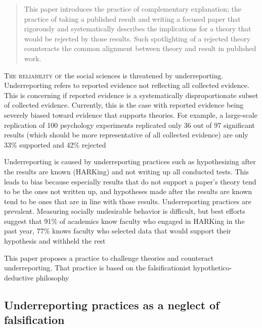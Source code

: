 \documentclass[empirical, authordate, meta]{jote-new-article}
\author[1]{Joeri van Hugten{\orcid{https://orcid.org/0000-0002-8040-5192}}}
\affil[1]{Vrije Universiteit Amsterdam}
\begin{document}
\begin{frontmatter}
\maketitle
\begin{abstract}
This paper introduces the practice of complementary explanation; the practice of taking a published result and writing a focused paper that rigorously and systematically describes the implications for a theory that would be rejected by those results. Such spotlighting of a rejected theory counteracts the common alignment between theory and result in published work.
\end{abstract}
\end{frontmatter}


\lettrine{T}{he reliability of} the social sciences is threatened by underreporting. Underreporting refers to reported evidence not reflecting all collected evidence. This is concerning if reported evidence is a systematically disproportionate subset of collected evidence. Currently, this is the case with reported evidence being severely biased toward evidence that supports theories. For example, a large-scale replication of 100 psychology experiments replicated only 36 out of 97 significant results \parencite{Collaboration2015}(which should be more representative of all collected evidence) are only 33\% supported and 42\% rejected \parencite{Mazzola2013, Hugten2021}

Underreporting is caused by underreporting practices such as hypothesizing after the results are known (HARKing) and not writing up all conducted tests. This leads to bias because especially results that do not support a paper's theory tend to be the ones not written up, and hypotheses made after the results are known tend to be ones that are in line with those results. Underreporting practices are prevalent. Measuring socially undesirable behavior is difficult, but best efforts suggest that 91\% of academics know faculty who engaged in HARKing in the past year, 77\% knows faculty who selected data that would support their hypothesis and withheld the rest \parencite{Bedeian2010, Rubin2017}

This paper proposes a practice to challenge theories and counteract underreporting. That practice is based on the falsificationist hypothetico-deductive philosophy \parencite{Witteloostuijn2016}



\subsection{Underreporting practices as a neglect of falsification}
\end{document}

